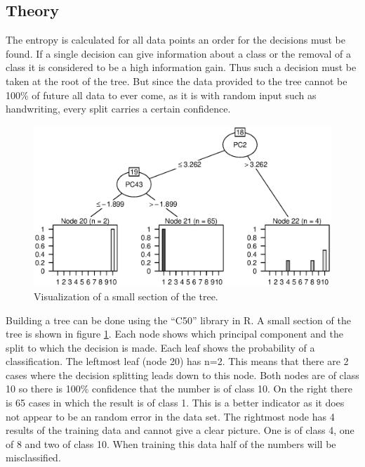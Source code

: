 \subsection{Theory}

The entropy is calculated for all data points an order for the decisions must be found.
If a single decision can give information about a class or the removal of a class it is considered to be a high information gain.
Thus such a decision must be taken at the root of the tree.
But since the data provided to the tree cannot be 100\% of future all data to ever come, as it is with random input such as handwriting, every split carries a certain confidence.

\begin{figure}[h]
\includegraphics[width = \textwidth]{graphics/tree_section}
\caption[Visualization of a tree.]{Visualization of a small section of the tree.}
\label{fig:tree_section}
\end{figure}

Building a tree can be done using the ``C50'' library in R.
A small section of the tree is shown in figure \ref{fig:tree_section}.
Each node shows which principal component and the split to which the decision is made.
Each leaf shows the probability of a classification.
The leftmost leaf (node 20) has n=2. This means that there are 2 cases where the decision splitting leads down to this node.
Both nodes are of class 10 so there is 100\% confidence that the number is of class 10.
On the right there is 65 cases in which the result is of class 1. 
This is a better indicator as it does not appear to be an random error in the data set.
The rightmost node has 4 results of the training data and cannot give a clear picture.
One is of class 4, one of 8 and two of class 10. 
When training this data half of the numbers will be misclassified.

